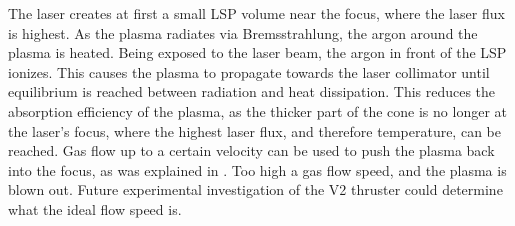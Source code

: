     The laser creates at first a small LSP volume near the focus, where the laser flux is highest. As the plasma radiates via Bremsstrahlung, the argon around the plasma is heated. Being exposed to the laser beam, the argon in front of the LSP ionizes. This causes the plasma to propagate towards the laser collimator until equilibrium is reached between radiation and heat dissipation. This reduces the absorption efficiency of the plasma, as the thicker part of the cone is no longer at the laser's focus, where the highest laser flux, and therefore temperature, can be reached. Gas flow up to a certain velocity can be used to push the plasma back into the focus, as was explained in \textcite{chenEmissionSpectroscopyCw1989a}. Too high a gas flow speed, and the plasma is blown out. Future experimental investigation of the V2 thruster could determine what the ideal flow speed is.



    